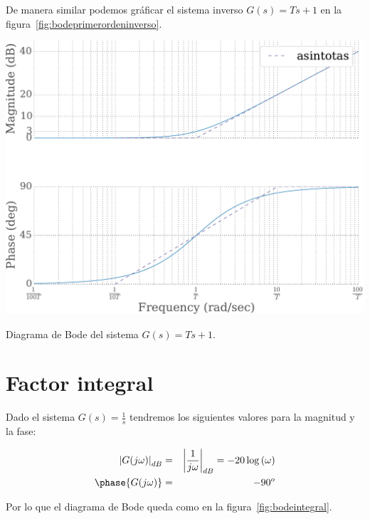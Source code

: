         De manera similar podemos gráficar el sistema inverso $G(s) =Ts + 1$ en la figura~\ref{fig:bodeprimerordeninverso}.

        \begin{marginfigure}
            \centering
            \includegraphics[width=\textwidth]{./imagenes/bodeprimerordeninverso.pdf}
            \caption{\label{fig:bodeprimerordeninverso}Diagrama de Bode del sistema $G(s) = Ts + 1$.}
        \end{marginfigure}


        \newpage
        \section{Factor integral}

            Dado el sistema $G(s) = \frac{1}{s}$ tendremos los siguientes valores para la magnitud y la fase:

            \begin{eqnarray*}
                \left| G(j \omega) \right|_{dB} & = & \left| \frac{1}{j \omega} \right|_{dB} = -20 \log{(\omega)} \\
                \phase{G(j \omega)} & = & -90^o
            \end{eqnarray*}

            Por lo que el diagrama de Bode queda como en la figura~\ref{fig:bodeintegral}.

